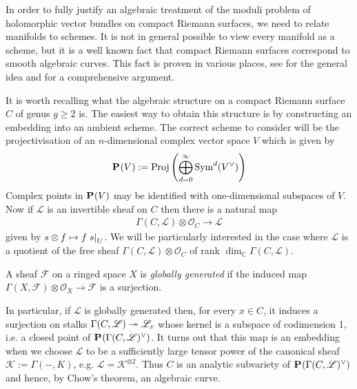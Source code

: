 \documentclass[12pt]{ociamthesis}  %
\begin{document}
In order to fully justify an algebraic treatment of the
moduli problem of holomorphic vector bundles on compact Riemann surfaces, we
need to relate manifolds to schemes. It is not in general possible
to view every manifold as a scheme, but it is a well known fact that
compact Riemann surfaces correspond to smooth algebraic curves.
This fact is proven in various places, see \cite[215]{griffiths1994}
for the general idea and \cite[5-16]{harris2011}
for a comprehensive argument.

It is worth recalling what the algebraic structure on a compact
Riemann surface $C$ of genus $g\geq 2$ is. The easiest way to obtain
this structure is by constructing an embedding into an ambient
scheme. The correct scheme to consider will be the projectivisation
of an $n$-dimensional complex vector space $V$ which is given
by
\begin{align*}
  \mathbf{P}^{}_{}(V) := \operatorname{Proj}\left({
        \bigoplus_{d=0}^\infty \operatorname{Sym}^d(V^\vee)
      }\right)
\end{align*}
Complex points in $\mathbf{P}^{}_{}(V)$ may be identified
with one-dimensional subspaces of $V$.
Now if $\mathscr L$ is
an invertible sheaf on $C$ then there is a natural map
\begin{align}\label{eq:natural_line_bundle_map}
  \Gamma(C,\mathscr L)\otimes\mathscr O_C \to \mathscr L
\end{align}
given by $s\otimes f \mapsto f\left.{s}\right\vert_{U}$. We will be
particularly interested in the case where $\mathscr L$ is a
quotient of the free sheaf
$\Gamma(C,\mathscr L)\otimes\mathscr O_C$ of rank
$\dim_{\mathbb C} \Gamma(C,\mathscr L)$.

\begin{definition}
  A sheaf $\mathscr F$ on a ringed space $X$ is
  \emph{globally generated} if the induced map
  $\Gamma(X,\mathscr F) \otimes \mathscr O_X \to \mathscr F$
  is a surjection.
\end{definition}

In particular, if $\mathscr L$ is globally generated then, for every $x\in C$,
it induces a surjection on stalks $\Gamma(C,\mathscr L) \twoheadrightarrow \mathscr L_x$
whose kernel is a subspace of codimension 1, i.e. a closed point of
$\mathbf{P}^{}_{}(\Gamma(C,\mathscr L)^\vee)$. It turns out that this map is an
embedding when we choose $\mathscr L$ to be a sufficiently large tensor power of
the canonical sheaf $\mathscr K := \Gamma(-,K)$, e.g. $\mathscr L = \mathscr
  K^{\otimes 2}$.  Thus $C$ is an analytic subvariety of
$\mathbf{P}^{}_{}(\Gamma(C,\mathscr L)^\vee)$ and hence, by Chow's
theorem, an algebraic curve.
\end{document}
